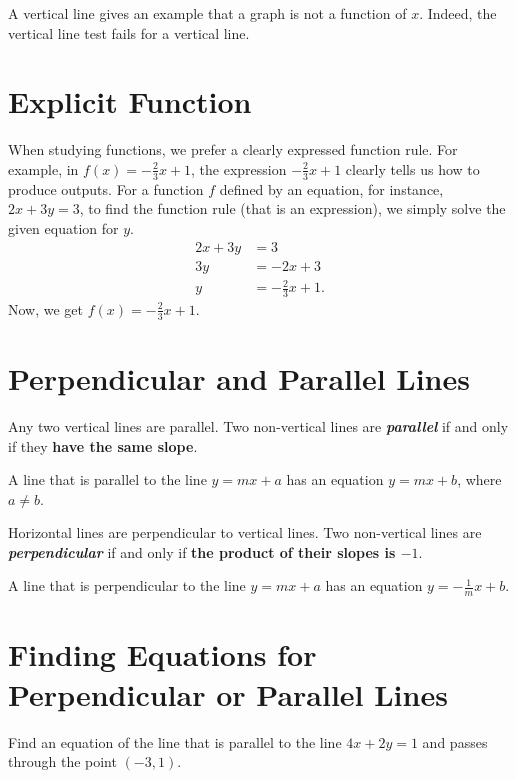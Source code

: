 \documentclass[en,12pt]{elegantbook}
\let\BeginKnitrBlock\begin \let\EndKnitrBlock\end
\begin{document}
A vertical line gives an example that a graph is not a function of \(x\). Indeed,
the vertical line test fails for a vertical line.

\hypertarget{explicit-function}{%
\section{Explicit Function}\label{explicit-function}}

When studying functions, we prefer a clearly expressed function rule. For example, in \(f(x)=-\frac23x+1\), the expression \(-\frac23x+1\) clearly tells us how to produce outputs. For a function \(f\) defined by an equation, for instance, \(2x+3y=3\), to find the function rule (that is an expression), we simply solve the given equation for \(y\).
\[
\begin{aligned}
2x+3y&=3\\
3y&=-2x+3\\
y&=-\frac23x+1.
\end{aligned}
\]
Now, we get \(f(x)=-\frac23x+1\).

\hypertarget{perpendicular-and-parallel-lines}{%
\section{Perpendicular and Parallel Lines}\label{perpendicular-and-parallel-lines}}

Any two vertical lines are parallel. Two non-vertical lines are \textbf{\emph{parallel}} if and only if they \textbf{have the same slope}.

A line that is parallel to the line \(y=mx+a\) has an equation \(y=mx+b\), where \(a\neq b\).

Horizontal lines are perpendicular to vertical lines. Two non-vertical lines are \textbf{\emph{perpendicular}} if and only if \textbf{the product of their slopes is \(-1\)}.

A line that is perpendicular to the line \(y=mx+a\) has an equation \(y=-\frac1m x+b\).

\hypertarget{finding-equations-for-perpendicular-or-parallel-lines}{%
\section{Finding Equations for Perpendicular or Parallel Lines}\label{finding-equations-for-perpendicular-or-parallel-lines}}

\BeginKnitrBlock{example}
\protect\hypertarget{exm:unnamed-chunk-261}{}{\label{exm:unnamed-chunk-261} }
Find an equation of the line that is parallel to the line \(4x+2y=1\) and passes through the point \((-3, 1)\).
\EndKnitrBlock{example}
\end{document}
